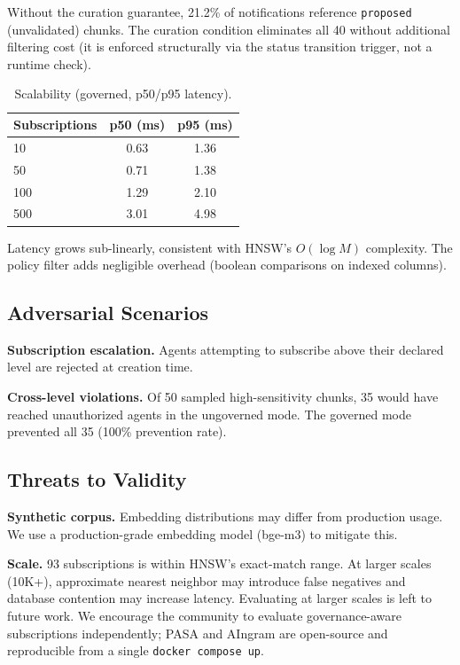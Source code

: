 \documentclass[11pt]{article}
\begin{document}
Without the curation guarantee, 21.2\% of notifications reference \texttt{proposed} (unvalidated) chunks. The curation condition eliminates all 40 without additional filtering cost (it is enforced structurally via the status transition trigger, not a runtime check).

\begin{table}[h]
\centering
\caption{Scalability (governed, p50/p95 latency).}
\label{tab:scalability}
\small
\begin{tabular}{@{}lcc@{}}
\toprule
Subscriptions & p50 (ms) & p95 (ms) \\
\midrule
10 & 0.63 & 1.36 \\
50 & 0.71 & 1.38 \\
100 & 1.29 & 2.10 \\
500 & 3.01 & 4.98 \\
\bottomrule
\end{tabular}
\end{table}

Latency grows sub-linearly, consistent with HNSW's $O(\log M)$ complexity. The policy filter adds negligible overhead (boolean comparisons on indexed columns).

\subsection{Adversarial Scenarios}

\textbf{Subscription escalation.} Agents attempting to subscribe above their declared level are rejected at creation time.

\textbf{Cross-level violations.} Of 50 sampled high-sensitivity chunks, 35 would have reached unauthorized agents in the ungoverned mode. The governed mode prevented all 35 (100\% prevention rate).

\subsection{Threats to Validity}

\textbf{Synthetic corpus.} Embedding distributions may differ from production usage. We use a production-grade embedding model (bge-m3) to mitigate this.

\textbf{Scale.} 93 subscriptions is within HNSW's exact-match range. At larger scales (10K+), approximate nearest neighbor may introduce false negatives and database contention may increase latency. Evaluating at larger scales is left to future work. We encourage the community to evaluate governance-aware subscriptions independently; PASA and AIngram are open-source and reproducible from a single \texttt{docker compose up}.
\end{document}
